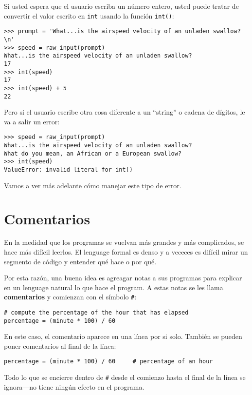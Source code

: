 \begin{ex}

Si usted espera que el usuario escriba un n\'umero entero, usted puede tratar de convertir el valor escrito en {\tt int} usando la funci\'on {\tt int()}:

\beforeverb
\begin{verbatim}
>>> prompt = 'What...is the airspeed velocity of an unladen swallow?\n'
>>> speed = raw_input(prompt)
What...is the airspeed velocity of an unladen swallow?
17
>>> int(speed)
17
>>> int(speed) + 5
22
\end{verbatim}
\afterverb
%
Pero si el usuario escribe otra cosa diferente a un ``string'' o cadena de d\'igitos,
le va a salir un error:

\beforeverb
\begin{verbatim}
>>> speed = raw_input(prompt)
What...is the airspeed velocity of an unladen swallow?
What do you mean, an African or a European swallow?
>>> int(speed)
ValueError: invalid literal for int()
\end{verbatim}
\afterverb
%
Vamos a ver m\'as adelante c\'omo manejar este tipo de error.



\section{Comentarios}

En la medidad que los programas se vuelvan m\'as grandes y m\'as complicados, se hace m\'as dif\'icil leerlos. El lenguage formal es denso y a vececes es dif\'icil mirar un segmento de c\'odigo y entender qu\'e hace o por qu\'e.

Por esta raz\'on, una buena idea es agreagar notas a sus programas para explicar
en un lenguage natural lo que hace el program. A estas notas se les llama
{\bf comentarios} y comienzan con el s\'imbolo \verb"#":

\beforeverb
\begin{verbatim}
# compute the percentage of the hour that has elapsed
percentage = (minute * 100) / 60
\end{verbatim}
\afterverb
%
En este caso, el comentario aparece en una l\'inea por si solo. Tambi\'en se pueden poner comentarios al final de la l\'inea:

\beforeverb
\begin{verbatim}
percentage = (minute * 100) / 60     # percentage of an hour
\end{verbatim}
\afterverb
%
Todo lo que se encierre dentro de {\tt \#} desde el comienzo hasta el final de la l\'inea se ignora---no tiene ning\'un efecto en el programa.


\end{ex}
